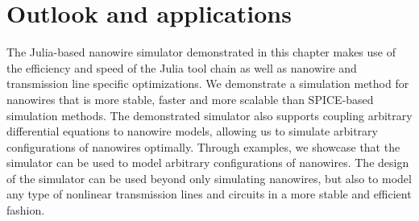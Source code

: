 \section{Outlook and applications}

The Julia-based nanowire simulator demonstrated in this chapter makes use of the 
efficiency and speed of
the Julia tool chain as well as nanowire and transmission line specific optimizations. 
We demonstrate a simulation
method for nanowires that is more stable, faster and more scalable than SPICE-based simulation
methods. The demonstrated simulator also supports coupling arbitrary differential equations to
nanowire models, allowing us to simulate arbitrary configurations of nanowires optimally.
Through examples, we showcase that the simulator can be used to model arbitrary configurations
of nanowires. The design of the simulator can be used beyond only simulating nanowires, but also to 
model any type of nonlinear transmission lines and circuits in a more stable and efficient fashion.